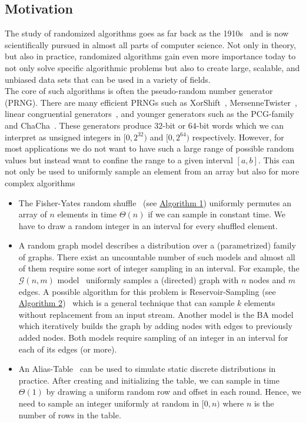 \documentclass[a4paper, UKenglish, cleveref, autoref, thm-restate]{lipics-v2021}
\begin{document}
\subsection{Motivation}
The study of randomized algorithms goes as far back as the 1910s~\cite{MathComp} and is now scientifically pursued in almost all parts of computer science.
Not only in theory, but also in practice, randomized algorithms gain even more importance today to not only solve specific algorithmic problems but also to create large, scalable, and unbiased data sets that can be used in a variety of fields.
\\
The core of such algorithms is often the pseudo-random number generator (PRNG).
There are many efficient PRNGs such as XorShift~\cite{XS}, MersenneTwister~\cite{MT}, linear congruential generators~\cite{LinConGen, MINSTD, LM}, and younger generators such as the PCG-family~\cite{PCG} and ChaCha~\cite{Cha}.
These generators produce $32$-bit or $64$-bit words which we can interpret as unsigned integers in $[0,2^{32})$ and $[0,2^{64})$ respectively.
However, for most applications we do not want to have such a large range of possible random values but instead want to confine the range to a given interval $[a,b]$.
This can not only be used to uniformly sample an element from an array but also for more complex algorithms
\begin{itemize}
    \item The Fisher-Yates random shuffle~\cite{FY} (see \hyperref[alg:fy]{Algorithm 1}) uniformly permutes an array of $n$ elements in time $\Theta(n)$ if we can sample in constant time. 
    We have to draw a random integer in an interval for every shuffled element.
    \item A random graph model describes a distribution over a (parametrized) family of graphs. 
    There exist an uncountable number of such models and almost all of them require some sort of integer sampling in an interval. 
    For example, the $\mathcal{G}(n,m)$ model~\cite{GNM} uniformly samples a (directed) graph with $n$ nodes and $m$ edges. 
    A possible algorithm for this problem is Reservoir-Sampling (see \hyperref[alg:gnm]{Algorithm 2})~\cite{Reservoir} which is a general technique that can sample $k$ elements without replacement from an input stream. 
    Another model is the BA model~\cite{BABook,BA} which iteratively builds the graph by adding nodes with edges to previously added nodes. %
    Both models require sampling of an integer in an interval for each of its edges (or more).
    \item An Alias-Table~\cite{Alias} can be used to simulate static discrete distributions in practice. 
    After creating and initializing the table, we can sample in time $\Theta(1)$ by drawing a uniform random row and offset in each round. 
    Hence, we need to sample an integer uniformly at random in $[0,n)$ where $n$ is the number of rows in the table.
\end{itemize}
\end{document}
